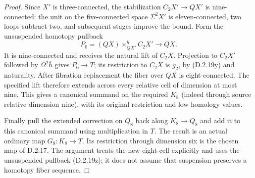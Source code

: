 \begin{proof}
Since $X'$ is three-connected, the stabilization
$C_2X'\to QX'$ is nine-connected: the unit on
the five-connected space $\Sigma^2X'$ is
eleven-connected, two loops subtract two, and
subsequent stages improve the bound.
Form the unsuspended homotopy pullback
\[
 P_0=(QX)\times^h_{QX'} C_2X'
          \longrightarrow QX.
 \tag{D.2.19z}
\]
It is nine-connected and receives the natural lift
of $C_2X$. Projection to $C_2X'$ followed by
$\Omega^2\overline h$ gives $P_0\to T$; its
restriction to $C_2X$ is $g_2$, by
\textup{(D.2.19y)} and naturality.
After fibration replacement the fiber over $QX$
is eight-connected. The specified lift therefore
extends across every relative cell of dimension
at most nine. This gives a canonical summand on
the required $K_8$ (indeed through source relative
dimension nine), with its original restriction
and low homology values.

Finally pull the extended correction on $Q_8$
back along $K_8\to Q_8$ and add it to this
canonical summand using multiplication in $T$.
The result is an actual ordinary map $G_8:K_8\to T$.
Its restriction through dimension six is the
chosen map of D.2.17. The argument treats the new
eight-cell explicitly and uses the unsuspended
pullback \textup{(D.2.19z)}; it does not assume
that suspension preserves a homotopy fiber sequence.
\end{proof}
